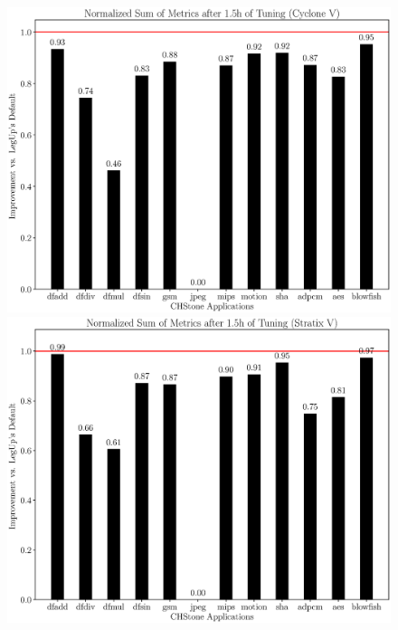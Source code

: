 \documentclass[12pt, a4paper]{article}
\begin{document}
\newpage

\begin{figure}[htpb]
    \centering
    \begin{minipage}{.48\textwidth}
        \centering
        \includegraphics[scale=.29]{nsam_5400_chstone_CycloneV}
    \end{minipage}%
    \hfill
    \begin{minipage}{.48\textwidth}
        \centering
        \includegraphics[scale=.29]{nsam_5400_chstone_StratixV}
    \end{minipage}%
\end{figure}
\end{document}

